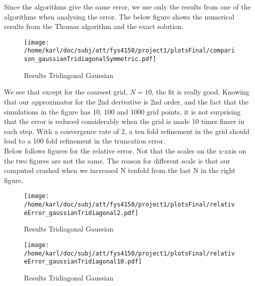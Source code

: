 \documentclass{article}
\begin{document}
\begin{minipage}{.32\textwidth} %
	
\end{minipage}\hfill
\begin{minipage}{.32\textwidth} %
	
\end{minipage}\hfill
\begin{minipage}{.32\textwidth}
	
\end{minipage}\hfill

Since the algorithms give the same error, we use only the results from one of the algorithms when analysing the error. The below figure shows the numerical results from the Thomas algorithm and the exact solution.

\begin{figure}
	\centering
	\texttt{[image: /home/karl/doc/subj/att/fys4150/project1/plotsFinal/comparison\_gaussianTridiagonalSymmetric.pdf]}
	\caption{Results Tridiagonal Gaussian}
	\label{fig:comparisongaussiantridiagonalsymmetric}
\end{figure}

We see that except for the coarsest grid, $N=10$, the fit is really good. Knowing that our approximator for the 2nd derivative is 2nd order, and the fact that the simulations in the figure has 10, 100 and 1000 grid points, it is not surprising that the error is reduced considerably when the grid is made 10 times finser in each step. With a convergence rate of 2, a ten fold refinement in the grid should lead to a 100 fold refinement in the truncation error.\\

Below follows figures for the relative error. Not that the scales on the x-axis on the two figures are not the same. The reason for different scale is that our computed crashed when we increased N tenfold from the last N in the right figure.\\


\begin{minipage}{.49\textwidth} %
\begin{figure}[H]
	\centering
	\texttt{[image: /home/karl/doc/subj/att/fys4150/project1/plotsFinal/relativeError\_gaussianTridiagonal2.pdf]}
	\caption{Results Tridiagonal Gaussian}
	\label{1}
\end{figure}
\end{minipage}\hfill
\begin{minipage}{.49\textwidth}
\begin{figure}[H]
	\centering
	\texttt{[image: /home/karl/doc/subj/att/fys4150/project1/plotsFinal/relativeError\_gaussianTridiagonal10.pdf]}
	\caption{Results Tridiagonal Gaussian}
	\label{1}
\end{figure}

\end{minipage}\hfill
\end{document}
